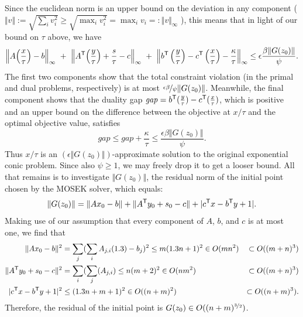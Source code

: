 \begin{subappendices}
\begin{lproof}
\[    \]
    Since the euclidean norm is an upper bound on the deviation in any component
    ( $\Vert v \Vert := \sqrt{\sum_i v_i^2} \ge \sqrt{\max_i v_i^2} = \max_i v_i =: \Vert v\Vert_\infty$ ), this means that in light of our bound on $\tau$ above, we have
    \[
        \Big\Vert A \Big(\frac x\tau\Big) - b \Big\Vert_\infty
        ~+~\Big\Vert A^{\sf T} \Big(\frac y\tau\Big) + \frac{s}\tau - c \Big\Vert_\infty
        ~+~\Big\Vert b^{\sf T} \left(\frac{y}{\tau}\right) - c^{\sf T} \left(\frac{x}{\tau}\right) - \frac\kappa\tau \Big\Vert_\infty
        \le \epsilon  \frac{\beta \Vert G(z_0) \Vert}{\psi }.
    \]
    The first two components show that the total constraint violation (in the primal and dual problems, respectively) is at most $\nicefrac{\epsilon\beta}{\psi} \Vert G(z_0) \Vert$.
    Meanwhile, the final component shows that the duality gap
    $\mathit{gap} = b^{\sf T} (\frac{y}{\tau}) - c^{\sf T} (\frac{x}{\tau})$,
    which is positive and an upper bound on the difference between the objective at $x/\tau$ and the optimal objective value, satisfies
    \[
        \mathit{gap}  \le \mathit{gap} + \frac\kappa\tau \le \frac{\epsilon \beta \Vert G(z_0) \Vert}{\psi}.
    \]
    Thus $x/\tau$ is an $(\epsilon \Vert G(z_0)\Vert)$-approximate solution to the original exponential conic problem.
    Since also $\psi \ge 1$, we may freely drop it to get a looser bound.
    All that remains is to investigate $\Vert G(z_0) \Vert$,
     the residual norm of the initial point
        chosen by the MOSEK solver, which equals:
    \[
        \Vert G(z_0) \Vert
        = \Vert A x_0 - b \Vert
            + \Vert A^{\sf T} y_0 + s_0 - c  \Vert
            + | c^{\sf T} x - b^{\sf T} y + 1 |.
    \]
    Making use of our assumption that every component of $A$, $b$, and $c$ is at most one, we find that
    \begin{align*}
        \Vert A x_0 - b \Vert^2
            &= \sum_j (\sum_i A_{j,i} (1.3)  - b_j)^2
            \le m (1.3n+1)^2 \in O(m n^2)
                &\subset O((m+n)^3)\\
        \Vert A^{\sf T}y_0 + s_0 - c \Vert^2
            &= \sum_i (\sum_j (A_{j,i})
            \le n (m + 2)^2 \in O(n m^2)
                &\subset O((m+n)^3) \\
        | c^{\sf T} x - b^{\sf T} y + 1 | ^2
            &\le (1.3n + m + 1)^2 \in O( (n+m)^2 )
                &\subset O((n+m)^3).
    \end{align*}
    Therefore, the residual of the initial point is
        $G(z_0) \in O((n+m)^{\nicefrac32})$.


\end{lproof}
\end{subappendices}

